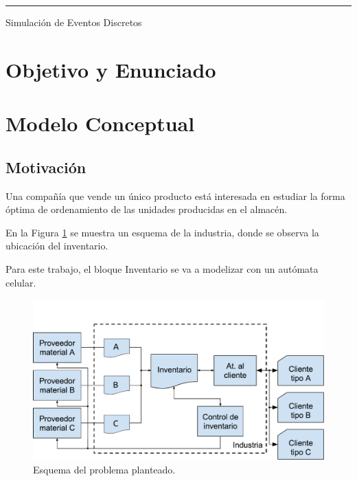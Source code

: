 \documentclass[10pt]{article}
\begin{document}
\begin{titlepage}
\vfill

\hrule
\vspace{0.2cm}

\noindent\small{Simulación de Eventos Discretos}

\end{titlepage}

%
%
\setcounter{page}{1}

%
%
\tableofcontents
\newpage

%
%

\section{Objetivo y Enunciado}

\section{Modelo Conceptual}
\subsection{Motivación\label{sec:motivacion}}

Una compañía que vende un único producto está interesada en estudiar la forma óptima de ordenamiento de las unidades producidas en el almacén.

En la Figura \ref{fig:esquema-del-problema} se muestra un esquema de la industria, donde se observa la ubicación del inventario.

Para este trabajo, el bloque Inventario se va a modelizar con un autómata celular.

\begin{figure}[h]
\centering
\includegraphics[width=\textwidth]{img/figura1}
\caption{Esquema del problema planteado.}
\label{fig:esquema-del-problema}
\end{figure}
\FloatBarrier 
\end{document}
